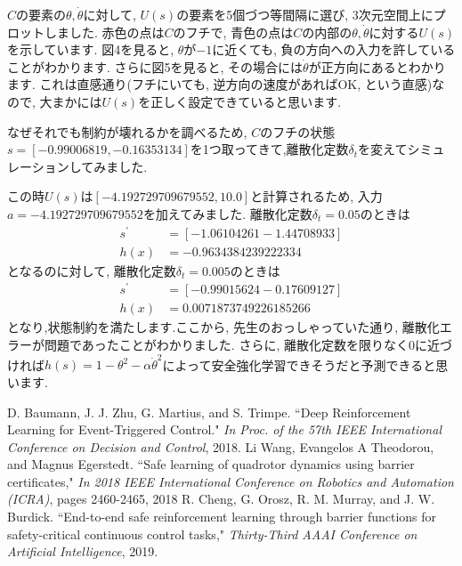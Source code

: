\documentclass{jsarticle}
\begin{document}
$C$の要素の$\theta, \dot{\theta}$に対して, $U(s)$の要素を5個づつ等間隔に選び, 3次元空間上にプロットしました. 赤色の点は$C$のフチで, 青色の点は$C$の内部の$\theta, \dot{\theta}$に対する$U(s)$を示しています. 図4を見ると, $\theta$が$-1$に近くても, 負の方向への入力を許していることがわかります. さらに図5を見ると, その場合には$\dot{\theta}$が正方向にあるとわかります. これは直感通り(フチにいても, 逆方向の速度があればOK, という直感)なので, 大まかには$U(s)$を正しく設定できていると思います.\par
なぜそれでも制約が壊れるかを調べるため, $C$のフチの状態$s = [-0.99006819, -0.16353134]$を1つ取ってきて,離散化定数$\delta_t$を変えてシミュレーションしてみました. \par
この時$U(s)$は$[-4.192729709679552, 10.0]$と計算されるため, 入力$a = -4.192729709679552$を加えてみました. 離散化定数$\delta_t=0.05$のときは
\begin{align*}
	s^{\prime} &= [-1.06104261 -1.44708933] \\
	h(x) &= -0.9634384239222334
\end{align*}
となるのに対して, 離散化定数$\delta_t=0.005$のときは
\begin{align*}
	s^{\prime} &= [-0.99015624 -0.17609127] \\
	h(x) &= 0.0071873749226185266
\end{align*}
となり,状態制約を満たします.ここから, 先生のおっしゃっていた通り, 離散化エラーが問題であったことがわかりました. さらに, 離散化定数を限りなく0に近づければ$h(s) = 1- \theta^2- \alpha\dot{\theta}^2$によって安全強化学習できそうだと予測できると思います.

\begin{thebibliography}{10}
D. Baumann, J. J. Zhu, G. Martius, and S. Trimpe. “Deep Reinforcement Learning for Event-Triggered Control."  \textit{In Proc. of the 57th IEEE International Conference on Decision and Control}, 2018.
Li Wang, Evangelos A Theodorou, and Magnus Egerstedt. “Safe learning of quadrotor dynamics using barrier certificates," \textit{In 2018 IEEE International Conference on Robotics and Automation (ICRA)}, pages 2460-2465, 2018
R. Cheng, G. Orosz, R. M. Murray, and J. W. Burdick.  “End-to-end safe reinforcement learning through barrier functions for safety-critical continuous control tasks," \textit{Thirty-Third AAAI Conference on Artificial Intelligence}, 2019.

\end{thebibliography}

 
\end{document}
